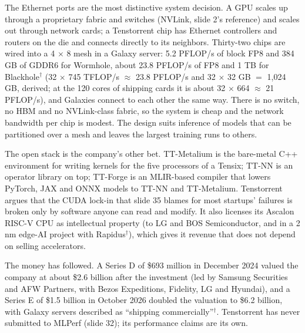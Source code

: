 \documentclass[11pt,letterpaper]{article}
\begin{document}
The Ethernet ports are the most distinctive system decision. A GPU scales up through a proprietary fabric and switches (NVLink, slide 2's reference) and scales out through network cards; a Tenstorrent chip has Ethernet controllers and routers on the die and connects directly to its neighbors. Thirty-two chips are wired into a 4 $\times$ 8 mesh in a Galaxy server: 5.2 PFLOP/s of block FP8 and 384 GB of GDDR6 for Wormhole, about 23.8 PFLOP/s of FP8 and 1 TB for Blackhole$^\dagger$ (32 $\times$ 745 TFLOP/s $\approx$ 23.8 PFLOP/s and 32 $\times$ 32 GB $=$ 1{,}024 GB, derived; at the 120 cores of shipping cards it is about 32 $\times$ 664 $\approx$ 21 PFLOP/s), and Galaxies connect to each other the same way. There is no switch, no HBM and no NVLink-class fabric, so the system is cheap and the network bandwidth per chip is modest. The design suits inference of models that can be partitioned over a mesh and leaves the largest training runs to others.

The open stack is the company's other bet. TT-Metalium is the bare-metal C++ environment for writing kernels for the five processors of a Tensix; TT-NN is an operator library on top; TT-Forge is an MLIR-based compiler that lowers PyTorch, JAX and ONNX models to TT-NN and TT-Metalium. Tenstorrent argues that the CUDA lock-in that slide 35 blames for most startups' failures is broken only by software anyone can read and modify. It also licenses its Ascalon RISC-V CPU as intellectual property (to LG and BOS Semiconductor, and in a 2 nm edge-AI project with Rapidus$^\dagger$), which gives it revenue that does not depend on selling accelerators.

The money has followed. A Series D of \$693 million in December 2024 valued the company at about \$2.6 billion after the investment (led by Samsung Securities and AFW Partners, with Bezos Expeditions, Fidelity, LG and Hyundai), and a Series E of \$1.5 billion in October 2026 doubled the valuation to \$6.2 billion, with Galaxy servers described as ``shipping commercially''$^\dagger$. Tenstorrent has never submitted to MLPerf (slide 32); its performance claims are its own.
\end{document}
